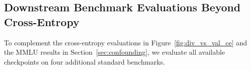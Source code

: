 
\subsection{Downstream Benchmark Evaluations Beyond Cross-Entropy}
\label{appendix:downstream_benchmarks}
To complement the cross-entropy evaluations in Figure~\ref{fig:div_vs_val_ce} and the MMLU results in Section~\ref{sec:confounding}, we evaluate all available checkpoints on four additional standard benchmarks.

